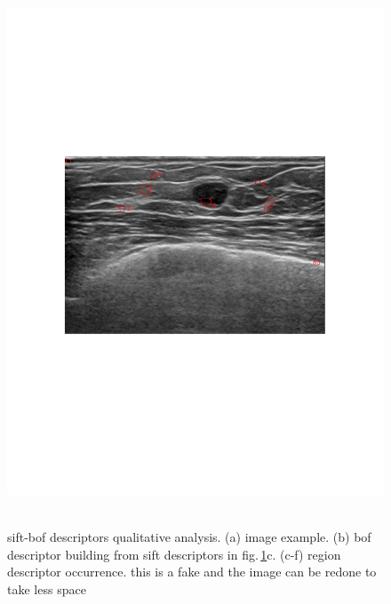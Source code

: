 \documentclass[a4paper, 10pt, conference]{llncs}      %
\begin{document}
\begin{figure}[Htbp]
\centering
 \includegraphics[trim = 91 300 100 242, clip,width=.5\textwidth]{appearance1.pdf}\\
  \,
 \,
 \,
  \,
   \,
 
\caption{\acs{sift}-\acs{bof} descriptors qualitative analysis. (a) image example. (b) \acs{bof} descriptor building from \ac{sift} descriptors in fig.\,\ref{fig:dictionary}c. (c-f) region descriptor occurrence.{\color{red} this is a fake and the image can be redone to take less space}}
\label{fig:dictionary}
\end{figure}
\end{document}
